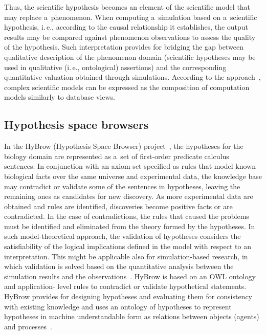 \begin{multicols}{2}
  Thus, the scientific hypothesis becomes an element of the scientific model that may replace a~phenomenon. When computing a~simulation based on a~scientific
hypothesis, i.\,e., according to the causal relationship it establishes, the output results
may be compared against phenomenon observations to assess the quality of the
hypothesis. Such interpretation provides for bridging the gap between qualitative
description of the phenomenon domain (scientific hypotheses may be used in
qualitative (i.\,e., ontological) assertions) and the corresponding quantitative
valuation obtained through simulations. According to the approach~\cite{43-kl},
complex scientific models can be expressed as the composition of computation
models similarly to database views.
{

}

\subsection{Hypothesis space browsers}

  \noindent
  In the HyBrow (Hypothesis Space Browser) project~\cite{44-kl}, the hypotheses
for the biology domain are represented as a~set of first-order predicate calculus
sentences. In conjunction with an axiom set specified as rules that model known
biological facts over the same universe and experimental data, the knowledge base
may contradict or validate some of the sentences in hypotheses, leaving the remaining
ones as candidates for new discovery. As more experimental data are obtained and
rules are identified, discoveries become positive facts or are contradicted. In the case of
contradictions, the rules that caused the problems must be identified and eliminated
from the theory formed by the hypotheses. In such model-theoretical approach, the
validation of hypotheses considers the satisfiability of the logical implications
defined in the model with respect to an interpretation. This might be applicable also
for simulation-based research, in which validation is solved based on the
quantitative analysis between the simulation results and the
  observations~\cite{43-kl}. HyBrow is based on an OWL ontology and application-
level rules to contradict or validate hypothetical statements. HyBrow provides for
designing hypotheses and evaluating them for consistency with existing knowledge
and uses an ontology of hypotheses to represent hypotheses in machine understandable
form as relations between objects (agents) and processes~\cite{45-kl}.


\end{multicols}
